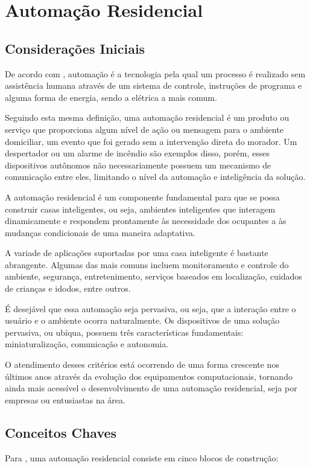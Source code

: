 \chapter {Automação Residencial}
\label{cap:1}

\section {Considerações Iniciais}
De acordo com , automação é a tecnologia pela qual um processo é realizado
sem assistência humana através de um sistema de controle, instruções de programa e alguma forma de energia,
sendo a elétrica a mais comum.

Seguindo esta mesma definição, uma automação residencial é um produto ou serviço que proporciona algum nível de
ação ou mensagem para o ambiente domiciliar, um evento que foi gerado sem a intervenção direta do morador. Um
despertador ou um alarme de incêndio são exemplos disso, porém, esses dispositivos autônomos não
necessariamente possuem um mecanismo de comunicação entre eles, limitando o nível da automação e inteligência
da solução. \cite{riley2012}

A automação residencial é um componente fundamental para que se possa construir casas inteligentes, ou seja,
ambientes inteligentes que interagem dinamicamente e respondem prontamente às necessidade dos ocupantes a às
mudanças condicionais de uma maneira adaptativa. \cite{al-qutayri2010}

A variade de aplicações suportadas por uma casa inteligente é bastante abrangente. Algumas das mais comuns incluem
monitoramento e controle do ambiente, segurança, entretenimento, serviços baseados em localização, cuidados
de crianças e idodos, entre outros. \cite{al-qutayri2010}

É desejável que essa automação seja pervasiva, ou seja, que a interação entre o usuário e o ambiente ocorra
naturalmente. Os dispositivos de uma solução pervasiva, ou ubíqua, possuem três características fundamentais:
miniaturalização, comunicação e autonomia. \cite{lalanda2010}

O atendimento desses critérios está ocorrendo de uma forma crescente nos últimos anos através da evolução dos
equipamentos computacionais, tornando ainda mais acessível o desenvolvimento de uma automação residencial,
seja por empresas ou entusiastas na área.

\section{Conceitos Chaves}
Para , uma automação residencial consiste em cinco blocos de construção:

